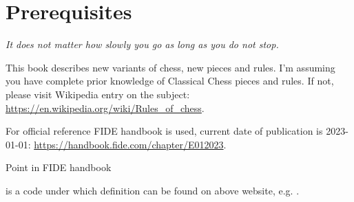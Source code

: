 

\chapter*{Prerequisites}
\label{ch:Prerequisites}

\begin{flushright}
\parbox{0.7\textwidth}{
\emph{It does not matter how slowly you go as long as you do not stop.\newline
{} } }
\end{flushright}

\noindent
This book describes new variants of chess, new pieces and rules. I'm assuming you
have complete prior knowledge of Classical Chess pieces and rules. If not, please
visit Wikipedia entry on the subject:\newline
\href{https://en.wikipedia.org/wiki/Rules\_of\_chess}{https://en.wikipedia.org/wiki/Rules\_of\_chess}.

For official reference \hypertarget{sec:Prerequisites/FIDE Handbook}{FIDE handbook}
is used, current date of publication is 2023-01-01:\newline
\href{https://handbook.fide.com/chapter/E012023}{https://handbook.fide.com/chapter/E012023}.

\hypertarget{sec:Prerequisites/FIDE point}{Point in FIDE handbook} is a code
under which definition can be found on above website, e.g. .

\clearpage %
